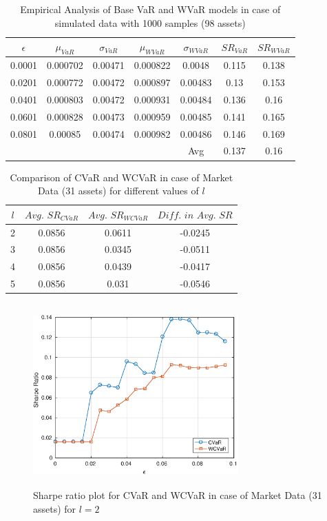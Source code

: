 \documentclass[12pt]{article}
\numberwithin{equation}{section}
\begin{document}
\begin{table}[!h]
\centering
\captionsetup{justification=centering}
\begin{tabular}{||c|c|c|c|c|c|c||}
\hline
$\epsilon$ & $\mu_{VaR}$ & $\sigma_{VaR}$ & $\mu_{WVaR}$ & $\sigma_{WVaR}$ & $SR_{VaR}$ & $SR_{WVaR}$\\
\hline
0.0001 & 0.000702 & 0.00471 & 0.000822 & 0.0048 & 0.115 & 0.138 \\
0.0201 & 0.000772 & 0.00472 & 0.000897 & 0.00483 & 0.13 & 0.153 \\
0.0401 & 0.000803 & 0.00472 & 0.000931 & 0.00484 & 0.136 & 0.16 \\
0.0601 & 0.000828 & 0.00473 & 0.000959 & 0.00485 & 0.141 & 0.165 \\
0.0801 & 0.00085 & 0.00474 & 0.000982 & 0.00486 & 0.146 & 0.169 \\
\hline
& & & & Avg & 0.137 & 0.16 \\
\hline
\end{tabular}
\caption{Empirical Analysis of Base VaR and WVaR models in case of simulated data with 1000 samples (98 assets)}
\label{tab:5.6}
\end{table}

\begin{table}[!h]
\centering
\captionsetup{justification=centering}
\begin{tabular}{||c|c|c|c||}
\hline
$l$ & $Avg. \, \, SR_{CVaR}$ & $Avg. \, \, SR_{WCVaR}$ & $Diff. \, \, in \, \, Avg. \, \, SR$ \\
\hline
2 & 0.0856 & 0.0611 & -0.0245 \\
3 & 0.0856 & 0.0345 & -0.0511 \\
4 & 0.0856 & 0.0439 & -0.0417 \\
5 & 0.0856 & 0.031 & -0.0546 \\
\hline
\end{tabular}
\caption{Comparison of CVaR and WCVaR in case of Market Data (31 assets) for different values of $l$}
\label{avgtab:6.1}
\end{table}

\begin{figure}[!h]
\centering
\includegraphics[height=7.0cm,width=0.7\textwidth]{CVaR/bse30_market/sr_cvar_2.eps}
\caption{Sharpe ratio plot for CVaR and WCVaR in case of Market Data (31 assets) for $l=2$}
\label{fig:6.1}
\end{figure}
\end{document}
